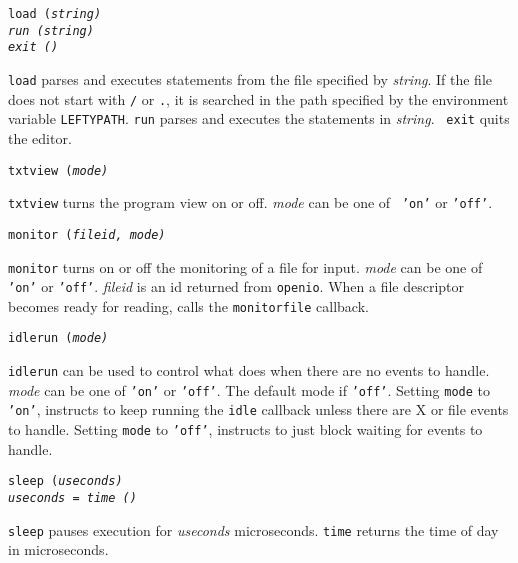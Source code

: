 \begin{flushleft}
\tt load (\it string\tt )\\
\tt run (\it string\tt )\\
\tt exit ()\\
\end{flushleft}\vspace{-2\itemsep}
{\tt load} parses and executes {\LEFTY} statements from the file specified by
{\it string}. If the file does not start with {\tt /} or {\tt .}, it is
searched in the path specified by the environment variable {\tt LEFTYPATH}.
{\tt run} parses and executes the {\LEFTY} statements in {\it string}.  {\tt
exit} quits the editor.

\begin{flushleft}
\tt txtview (\it mode\tt )\\
\end{flushleft}\vspace{-2\itemsep}
{\tt txtview} turns the program view on or off. {\it mode} can be one of {\tt
'on'} or {\tt 'off'}.

\begin{flushleft}
\tt monitor (\it fileid, mode\tt )\\
\end{flushleft}\vspace{-2\itemsep}
{\tt monitor} turns on or off the monitoring of a file for input. {\it mode}
can be one of {\tt 'on'} or {\tt 'off'}. {\it fileid} is an id returned from
{\tt openio}. When a file descriptor becomes ready for reading, {\LEFTY} calls
the {\tt monitorfile} callback.

\begin{flushleft}
\tt idlerun (\it mode\tt )\\
\end{flushleft}\vspace{-2\itemsep}
{\tt idlerun} can be used to control what {\LEFTY} does when there are no
events to handle. {\it mode}
can be one of {\tt 'on'} or {\tt 'off'}. The default mode if {\tt 'off'}.
Setting {\tt mode} to {\tt 'on'}, instructs {\LEFTY} to keep running the
{\tt idle} callback unless there are X or file events to handle.
Setting {\tt mode} to {\tt 'off'}, instructs {\LEFTY} to just block waiting
for events to handle.

\begin{flushleft}
\tt sleep (\it useconds\tt )\\
\it useconds \tt = time ()\\
\end{flushleft}\vspace{-2\itemsep}
{\tt sleep} pauses execution for {\it useconds} microseconds.
{\tt time} returns the time of day in microseconds.

